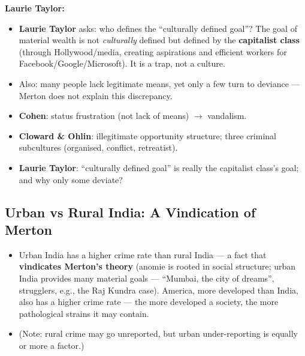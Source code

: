 \begin{CriticalPoint}
\textbf{Laurie Taylor:}
\begin{itemize}
\item \textbf{Laurie Taylor} asks: who defines the ``culturally defined goal''? The goal of material wealth is not \textit{culturally} defined but defined by the \textbf{capitalist class} (through Hollywood/media, creating aspirations and efficient workers for Facebook/Google/Microsoft). It is a trap, not a culture.
\item Also: many people lack legitimate means, yet only a few turn to deviance --- Merton does not explain this discrepancy.
\end{itemize}
\end{CriticalPoint}

\begin{QuickRevision}
\begin{itemize}
\item \textbf{Cohen}: status frustration (not lack of means) $\rightarrow$ vandalism.
\item \textbf{Cloward \& Ohlin}: illegitimate opportunity structure; three criminal subcultures (organised, conflict, retreatist).
\item \textbf{Laurie Taylor}: ``culturally defined goal'' is really the capitalist class's goal; and why only some deviate?
\end{itemize}
\end{QuickRevision}

\sectiondivider

\subsection{Urban vs Rural India: A Vindication of Merton}

\begin{DataFact}
\begin{itemize}
\item Urban India has a higher crime rate than rural India --- a fact that \textbf{vindicates Merton's theory} (anomie is rooted in social structure; urban India provides many material goals --- ``Mumbai, the city of dreams'', strugglers, e.g., the Raj Kundra case). America, more developed than India, also has a higher crime rate --- the more developed a society, the more pathological strains it may contain.
\item (Note: rural crime may go unreported, but urban under-reporting is equally or more a factor.)
\end{itemize}
\end{DataFact}

